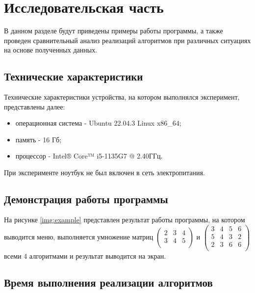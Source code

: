\chapter{Исследовательская часть}

В данном разделе будут приведены примеры работы программы, а также проведен сравнительный анализ реализаций алгоритмов при различных ситуациях на основе полученных данных.

\section{Технические характеристики}

Технические характеристики устройства, на котором выполнялся эксперимент, представлены далее:

\begin{itemize}
    \item операционная система - Ubuntu 22.04.3 \cite{ubuntu} Linux \cite{linux} x86\_64;
    \item память - 16 Гб;
    \item процессор - Intel® Core™ i5-1135G7 @ 2.40ГГц.
\end{itemize}

При эксперименте ноутбук не был включен в сеть электропитания.

\section{Демонстрация работы программы}

На рисунке \ref{img:example} представлен результат работы программы, на котором выводится меню, выполняется умножение матриц $\begin{pmatrix}
	2 & 3 & 4 \\
	3 & 4 & 5 \\
\end{pmatrix}$ и $\begin{pmatrix}
3 & 4 & 5 & 6 \\
5 & 4 & 3 & 2 \\
2 & 3 & 6 & 6 \\
\end{pmatrix}$ всеми 4 алгоритмами и результат выводится на экран.

\clearpage

\section{Время выполнения реализации алгоритмов}

